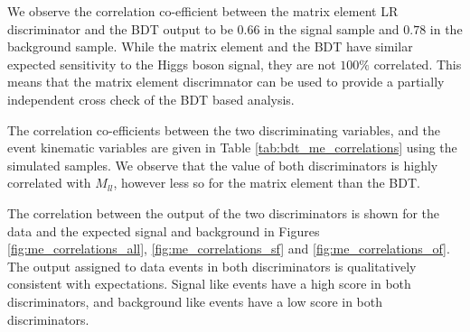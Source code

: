 We observe the correlation co-efficient between the
matrix element LR discriminator and the BDT output to be $0.66$ in the 
signal sample and $0.78$ in the background sample.
While the matrix element and the BDT have similar
expected sensitivity to the Higgs boson signal, they are not
$100\%$ correlated.  This means that the matrix element
discrimnator can be used to provide a partially independent
cross check of the BDT based analysis.

The correlation co-efficients between the
two discriminating variables, and the event kinematic variables
are given in Table \ref{tab:bdt_me_correlations} using the simulated samples.
We observe that the value of both discriminators is highly
correlated with $M_{ll}$, however less so for the 
matrix element than the BDT.

The correlation between the output of the two discriminators
is shown for the data and the expected signal and background
in Figures \ref{fig:me_correlations_all}, 
\ref{fig:me_correlations_sf} and \ref{fig:me_correlations_of}.
The output assigned to data events in both discriminators
is qualitatively consistent with expectations.
Signal like events have a high score in both discriminators,
and background like events have a low score in both discriminators.

